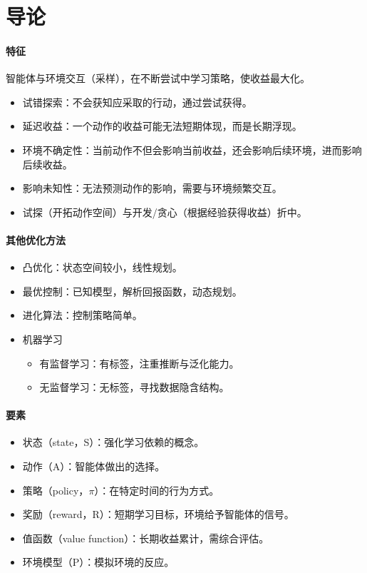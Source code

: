 \documentclass[
12pt, %
a4paper, 
oneside, %
headinclude,footinclude, %
]{scrartcl}
\title{\normalfont\spacedallcaps{强化学习}}
\date{}
\begin{document}
\maketitle
\newpage
\tableofcontents 
\newpage
\listoffigures
\listoftables
\listoftips
\newpage
\section{导论}
\paragraph{特征}
智能体与环境交互（采样），在不断尝试中学习策略，使收益最大化。
\begin{itemize}
\item 试错探索：不会获知应采取的行动，通过尝试获得。
\item 延迟收益：一个动作的收益可能无法短期体现，而是长期浮现。
\item 环境不确定性：当前动作不但会影响当前收益，还会影响后续环境，进而影响后续收益。
\item 影响未知性：无法预测动作的影响，需要与环境频繁交互。
\item 试探（开拓动作空间）与开发/贪心（根据经验获得收益）折中。
\end{itemize}
\paragraph{其他优化方法}
\begin{itemize}
\item 凸优化：状态空间较小，线性规划。
\item 最优控制：已知模型，解析回报函数，动态规划。
\item 进化算法：控制策略简单。
\item 机器学习
\begin{itemize}
\item 有监督学习：有标签，注重推断与泛化能力。
\item 无监督学习：无标签，寻找数据隐含结构。
\end{itemize}
\end{itemize}
\paragraph{要素}
\begin{itemize}
\item 状态（state，S）：强化学习依赖的概念。
\item 动作（A）：智能体做出的选择。
\item 策略（policy，$ \pi $）：在特定时间的行为方式。
\item 奖励（reward，R）：短期学习目标，环境给予智能体的信号。
\item 值函数（value function）：长期收益累计，需综合评估。
\item 环境模型（P）：模拟环境的反应。
\end{itemize}
\end{document}
